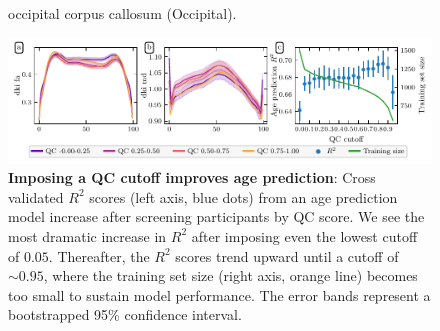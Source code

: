 \documentclass[9pt,lineno]{elife}
\begin{document}
\begin{figure}[tbp]
\begin{fullwidth}
{        occipital corpus callosum (Occipital).
    }
    \label{fig:qc-profiles:md}
    \label{figsupp:qc-profiles:fa}
\end{fullwidth}
\end{figure}

\begin{figure}
    \includegraphics[width=\hsize]{age-prediction/qc_sweep.pdf}
    \caption{%
        {\bf Imposing a QC cutoff improves age prediction}:
        Cross validated $R^2$ scores (left axis, blue dots) from an age
        prediction model increase after screening participants by QC score. We see
        the most dramatic increase in $R^2$ after imposing even the lowest
        cutoff of $0.05$. Thereafter, the $R^2$ scores trend upward until a
        cutoff of $\sim 0.95$, where the training set size (right axis, orange
        line) becomes too small to sustain model performance. The error bands
        represent a bootstrapped 95\% confidence interval.
    }
    \label{fig:age-prediction}
\end{figure}
\end{document}
